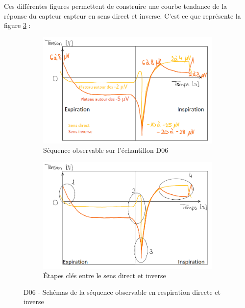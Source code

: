 Ces différentes figures permettent de construire une courbe tendance de la réponse du capteur \gls{capteur} en sens direct et inverse. C'est ce que représente 
la figure \ref{fig:schemas_tendance} :\\
\begin{figure}[H]
    \hspace{-1.5cm}
    \begin{subfigure}{0.45\textwidth}
        \includegraphics[scale = 0.5]{assets/figures/D06_courbe_tendance.png}
        \caption{Séquence observable sur l'échantillon D06}
        \label{fig:courbe_tendance}
    \end{subfigure}
    \hspace{2cm}
    \begin{subfigure}{0.48\textwidth}
        \includegraphics[scale = 0.5]{assets/figures/D06_courbe_tendance_diff.png}
        \caption{Étapes clés entre le sens direct et inverse}
        \label{fig:tendance_2}
    \end{subfigure}
    \caption{D06 - Schémas de la séquence observable en respiration directe et inverse}
    \label{fig:schemas_tendance}
\end{figure}


